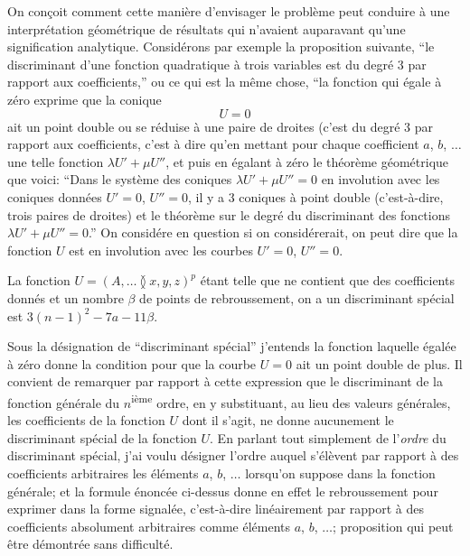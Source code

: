 \documentclass[11pt,a4paper]{article}
\begin{document}
\medskip

\noindent On con\c{c}oit comment cette mani\`{e}re d'envisager le probl\`{e}me peut conduire \`{a} une interpr\'{e}tation g\'{e}om\'{e}trique de r\'{e}sultats qui n'avaient auparavant qu'une signification analytique. Consid\'{e}rons par exemple la proposition suivante, ``le discriminant d'une fonction quadratique \`{a} trois variables est du degr\'{e} 3 par rapport aux coefficients,'' ou ce qui est la m\^{e}me chose, ``la fonction qui \'{e}gale \`{a} z\'{e}ro exprime que la conique
\[
U=0
\]
ait un point double ou se r\'{e}duise \`{a} une paire de droites (c'est du degr\'{e} 3 par rapport aux coefficients, c'est \`{a} dire qu'en mettant pour chaque coefficient $a$, $b$, $\ldots$ une telle fonction $\lambda U' + \mu U''$, et puis en \'{e}galant \`{a} z\'{e}ro le th\'{e}or\`{e}me g\'{e}om\'{e}trique que voici: ``Dans le syst\`{e}me des coniques $\lambda U' + \mu U''=0$ en involution avec les coniques donn\'{e}es $U'=0$, $U''=0$, il y a 3 coniques \`{a} point double (c'est-\`{a}-dire, trois paires de droites) et le th\'{e}or\`{e}me sur le degr\'{e} du discriminant des fonctions $\lambda U' + \mu U''=0$.'' On consid\'{e}re en question si on consid\'{e}rerait, on peut dire que la fonction $U$ est en involution avec les courbes $U'=0$, $U''=0$.

\medskip

\noindent La fonction $U=(A, \ldots\!\between\! x, y, z)^p$ \'{e}tant telle que ne contient que des coefficients donn\'{e}s et un nombre $\beta$ de points de rebroussement, on a un discriminant sp\'{e}cial est $3(n-1)^2 - 7a - 11\beta$.

\medskip

\noindent Sous la d\'{e}signation de ``discriminant sp\'{e}cial'' j'entends la fonction laquelle \'{e}gal\'{e}e \`{a} z\'{e}ro donne la condition pour que la courbe $U=0$ ait un point double de plus. Il convient de remarquer par rapport \`{a} cette expression que le discriminant de la fonction g\'{e}n\'{e}rale du $n$\textsuperscript{i\`{e}me} ordre, en y substituant, au lieu des valeurs g\'{e}n\'{e}rales, les coefficients de la fonction $U$ dont il s'agit, ne donne aucunement le discriminant sp\'{e}cial de la fonction $U$. En parlant tout simplement de l'\textit{ordre} du discriminant sp\'{e}cial, j'ai voulu d\'{e}signer l'ordre auquel s'\'{e}l\`{e}vent par rapport \`{a} des coefficients arbitraires les \'{e}l\'{e}ments $a$, $b$, $\ldots$ lorsqu'on suppose dans la fonction g\'{e}n\'{e}rale; et la formule \'{e}nonc\'{e}e ci-dessus donne en effet le rebroussement pour exprimer dans la forme signal\'{e}e, c'est-\`{a}-dire lin\'{e}airement par rapport \`{a} des coefficients absolument arbitraires comme \'{e}l\'{e}ments $a$, $b$, $\ldots$; proposition qui peut \^{e}tre d\'{e}montr\'{e}e sans difficult\'{e}.
\end{document}
